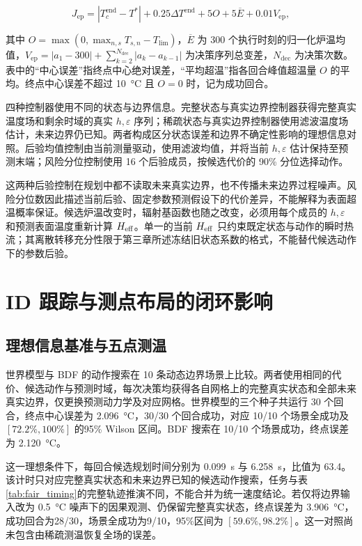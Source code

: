 \begin{equation}
  J_{\mathrm{ep}}=|T_c^{\mathrm{end}}-T^*|
  +0.25\Delta T^{\mathrm{end}}+5O+5\overline{E}+0.01V_{\mathrm{ep}},
  \label{eq:episode_control_objective}
\end{equation}

其中 $O=\max(0,\max_{n,s}T_{s,n}-T_{\mathrm{lim}})$，$\overline E$ 为 300 个执行时刻的归一化炉温均值，$V_{\mathrm{ep}}=|a_1-300|+\sum_{k=2}^{N_{\mathrm{dec}}}|a_k-a_{k-1}|$ 为决策序列总变差，$N_{\mathrm{dec}}$ 为决策次数。表中的“中心误差”指终点中心绝对误差，“平均超温”指各回合峰值超温量 $O$ 的平均。终点中心误差不超过 \SI{10}{\degreeCelsius} 且 $O=0$ 时，记为成功回合\cite{rawlings2017mpc}。

四种控制器使用不同的状态与边界信息。完整状态与真实边界控制器获得完整真实温度场和剩余时域的真实 $h,\varepsilon$ 序列；稀疏状态与真实边界控制器使用滤波温度场估计，未来边界仍已知。两者构成区分状态误差和边界不确定性影响的理想信息对照。后验均值控制由当前测量驱动，使用滤波均值，并将当前 $h,\varepsilon$ 估计保持至预测末端；风险分位控制使用 16 个后验成员，按候选代价的 90\% 分位选择动作\cite{moehle2021risk}。

这两种后验控制在规划中都不读取未来真实边界，也不传播未来边界过程噪声。风险分位数因此描述当前后验、固定参数预测假设下的代价差异，不能解释为表面超温概率保证。候选炉温改变时，辐射基函数也随之改变，必须用每个成员的 $h,\varepsilon$ 和预测表面温度重新计算 ${H_{\mathrm{eff}}}$。单一的当前 ${H_{\mathrm{eff}}}$ 只约束既定状态与动作的瞬时热流；其离散转移充分性限于第三章所述冻结旧状态系数的格式，不能替代候选动作下的参数后验。

\section{ID 跟踪与测点布局的闭环影响}

\subsection{理想信息基准与五点测温}

世界模型与 BDF 的动作搜索在 10 条动态边界场景上比较。两者使用相同的代价、候选动作与预测时域，每次决策均获得各自网格上的完整真实状态和全部未来真实边界，仅更换预测动力学及对应网格。世界模型的三个种子共运行 30 个回合，终点中心误差为 \SI{2.096}{\degreeCelsius}，30/30 个回合成功，对应 10/10 个场景全成功及 $[72.2\%,100\%]$ 的95\% Wilson 区间。BDF 搜索在 10/10 个场景成功，终点误差为 \SI{2.120}{\degreeCelsius}。

这一理想条件下，每回合候选规划时间分别为 \SI{0.099}{\second} 与 \SI{6.258}{\second}，比值为 63.4。该计时只对应完整真实状态和未来边界已知的候选动作搜索，任务与表\ref{tab:fair_timing}的完整轨迹推演不同，不能合并为统一速度结论。若仅将边界输入改为 \SI{0.5}{\degreeCelsius} 噪声下的因果观测、仍保留完整真实状态，终点误差为 \SI{3.906}{\degreeCelsius}，成功回合为28/30，场景全成功为9/10，95\%区间为 $[59.6\%,98.2\%]$。这一对照尚未包含由稀疏测温恢复全场的误差。

